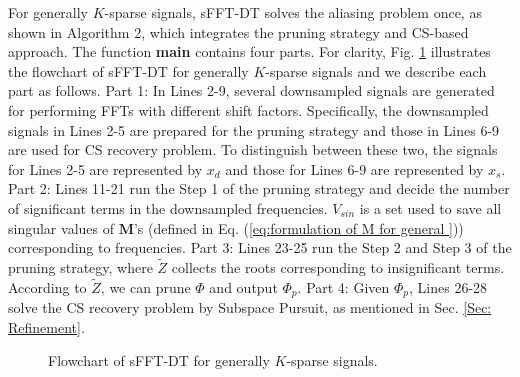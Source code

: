 \documentclass[journal,onecolumn,11pt]{IEEEtran}
\begin{document}
For generally $K$-sparse signals, sFFT-DT solves the aliasing problem once, as shown in Algorithm 2, which integrates the pruning strategy and CS-based approach.
The function \textbf{main} contains four parts.
For clarity, Fig. \ref{fig:flowchart} illustrates the flowchart of sFFT-DT for generally $K$-sparse signals and we describe each part as follows.
Part 1: In Lines 2-9, several downsampled signals are generated for performing FFTs with different shift factors.
Specifically, the downsampled signals in Lines 2-5 are prepared for the pruning strategy and those in Lines 6-9 are used for CS recovery problem.
To distinguish between these two, the signals for Lines 2-5 are represented by $x_{d}$ and those for Lines 6-9 are represented by $x_{s}$.
Part 2: Lines 11-21 run the Step 1 of the pruning strategy and decide the number of significant terms in the downsampled frequencies. $V_{sin}$ is a set used to save all singular values of $\bm{M}$'s (defined in Eq. (\ref{eq:formulation of M for general })) corresponding to frequencies.
Part 3: Lines 23-25 run the Step 2 and Step 3 of the pruning strategy, where $\tilde{Z}$ collects the roots corresponding to insignificant terms.
According to $\tilde{Z}$, we can prune $\Phi$ and output $\Phi_{p}$.
Part 4: Given $\Phi_{p}$, Lines 26-28 solve the CS recovery problem by Subspace Pursuit, as mentioned in Sec. \ref{Sec: Refinement}.

\begin{figure}[t]
\begin{minipage}[b]{.98\linewidth}
\end{minipage}
\hfill
\caption{Flowchart of sFFT-DT for generally $K$-sparse signals.}
\label{fig:flowchart}
\end{figure}
\end{document}
